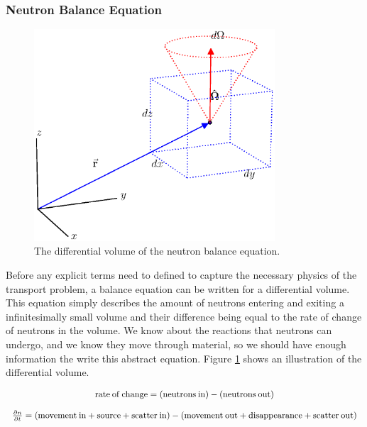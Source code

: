 \subsubsection{Neutron Balance Equation}

\begin{figure}[h!] 
  \centering
    \includegraphics[width=0.8\textwidth,trim= 0cm 2.5cm 0cm 0cm]{graphics/diff_balance.eps} 
     \caption{The differential volume of the neutron balance equation. \label{diff_volume}}
\end{figure}

Before any explicit terms need to defined to capture the necessary physics of the transport problem, a balance equation can be written for a differential volume.  This equation simply describes the amount of neutrons entering and exiting a infinitesimally small volume and their difference being equal to the rate of change of neutrons in the volume.  We know about the reactions that neutrons can undergo, and we know they move through material, so we should have  enough information the write this abstract equation. Figure \ref{diff_volume} shows an illustration of the differential volume.

\begin{equation}
\footnotesize
\label{NBE}
\begin{array}{c}
\mathrm{rate\:of\:change} = (\mathrm{neutrons\:in}) - (\mathrm{neutrons\:out}) \\
\\
\frac{\partial n}{\partial t} = ( \mathrm{movement\:in} + \mathrm{source} + \mathrm{scatter\:in}) - ( \mathrm{movement\:out} + \mathrm{disappearance} + \mathrm{scatter\:out})
\end{array}
\end{equation}

